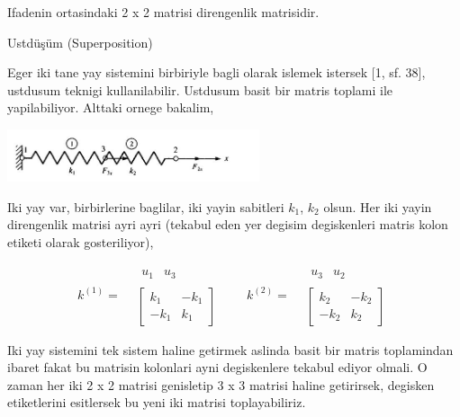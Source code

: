 \documentclass[12pt,fleqn]{article}\usepackage{../../common}
\begin{document}
Ifadenin ortasindaki 2 x 2 matrisi direngenlik matrisidir.

Ustdüşüm (Superposition)

Eger iki tane yay sistemini birbiriyle bagli olarak islemek istersek [1, sf. 38],
ustdusum teknigi kullanilabilir. Ustdusum basit bir matris toplami ile
yapilabiliyor. Alttaki ornege bakalim,

\includegraphics[width=20em]{phy_020_strs_06_02.jpg}

Iki yay var, birbirlerine baglilar, iki yayin sabitleri $k_1$, $k_2$
olsun. Her iki yayin direngenlik matrisi ayri ayri (tekabul eden yer degisim
degiskenleri matris kolon etiketi olarak gosteriliyor),

$$
k^{(1)} =
\begin{array}{cc} & \begin{array}{cc} u_1 & u_3 \end{array} \\ &
\left[
\begin{array}{cc}
k_1 & -k_1 \\ -k_1 & k_1
\end{array}
\right]
\end{array} 
\qquad
k^{(2)} =
\begin{array}{cc} & \begin{array}{cc} u_3 & u_2 \end{array} \\ &
\left[
\begin{array}{cc}
k_2 & -k_2 \\ -k_2 & k_2
\end{array}
\right]
\end{array}
$$

Iki yay sistemini tek sistem haline getirmek aslinda basit bir matris
toplamindan ibaret fakat bu matrisin kolonlari ayni degiskenlere tekabul ediyor
olmali. O zaman her iki 2 x 2 matrisi genisletip 3 x 3 matrisi haline
getirirsek, degisken etiketlerini esitlersek bu yeni iki matrisi
toplayabiliriz.
\end{document}
